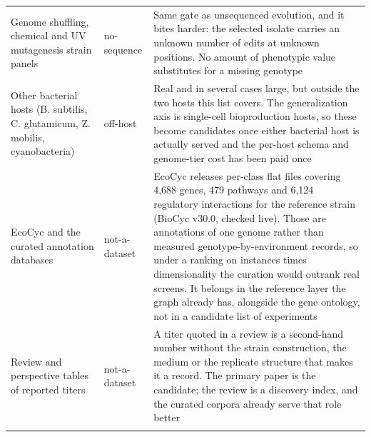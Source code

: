 \begin{longtable}{@{}L{58mm} L{28mm} L{83mm}@{}}
\addlinespace[5pt]
Genome shuffling, chemical and UV mutagenesis strain panels & no-sequence & Same gate as unsequenced evolution, and it bites harder: the selected isolate carries an unknown number of edits at unknown positions. No amount of phenotypic value substitutes for a missing genotype \\
\addlinespace[5pt]
Other bacterial hosts (B. subtilis, C. glutamicum, Z. mobilis, cyanobacteria) & off-host & Real and in several cases large, but outside the two hosts this list covers. The generalization axis is single-cell bioproduction hosts, so these become candidates once either bacterial host is actually served and the per-host schema and genome-tier cost has been paid once \\
\addlinespace[5pt]
EcoCyc and the curated annotation databases & not-a-dataset & EcoCyc releases per-class flat files covering 4,688 genes, 479 pathways and 6,124 regulatory interactions for the reference strain (BioCyc v30.0, checked live). Those are annotations of one genome rather than measured genotype-by-environment records, so under a ranking on instances times dimensionality the curation would outrank real screens. It belongs in the reference layer the graph already has, alongside the gene ontology, not in a candidate list of experiments \\
\addlinespace[5pt]
Review and perspective tables of reported titers & not-a-dataset & A titer quoted in a review is a second-hand number without the strain construction, the medium or the replicate structure that makes it a record. The primary paper is the candidate; the review is a discovery index, and the curated corpora already serve that role better \\
\addlinespace[5pt]
\end{longtable}
\endgroup
